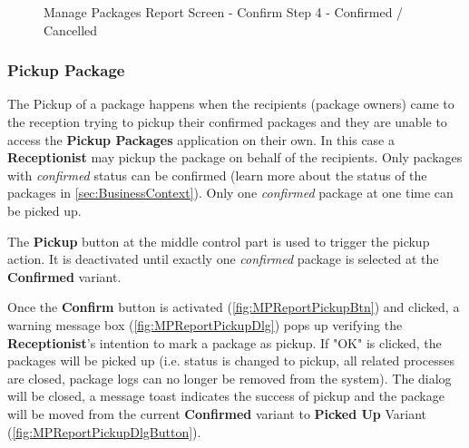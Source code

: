 \begin{figure}[H]
	\centering
	\hspace{5pt}
    \caption{Manage Packages Report Screen - Confirm Step 4 - Confirmed / Cancelled}
	\label{fig:MPReportConfirmDlgButton}
\end{figure}

\subsubsection{Pickup Package}
\label{subsubsec:MPpickup}

The Pickup of a package happens when the recipients (package owners) came to the reception trying to pickup their confirmed packages and they are unable to access the \textbf{Pickup Packages} application on their own. In this case a \textbf{Receptionist} may pickup the package on behalf of the recipients. Only packages with \textit{confirmed} status can be confirmed (learn more about the status of the packages in \autoref{sec:BusinessContext}). Only one \textit{confirmed} package at one time can be picked up.

The \textbf{Pickup} button at the middle control part is used to trigger the pickup action. It is deactivated until exactly one \textit{confirmed} package is selected at the \textbf{Confirmed} variant.

Once the \textbf{Confirm} button is activated (\autoref{fig:MPReportPickupBtn}) and clicked, a warning message box (\autoref{fig:MPReportPickupDlg}) pops up verifying the \textbf{Receptionist}'s intention to mark a package as pickup. If "OK" is clicked, the packages will be picked up (i.e. status is changed to pickup, all related processes are closed, package logs can no longer be removed from the system). The dialog will be closed, a message toast indicates the success of pickup and the package will be moved from the current \textbf{Confirmed} variant to \textbf{Picked Up} Variant (\autoref{fig:MPReportPickupDlgButton}). 

